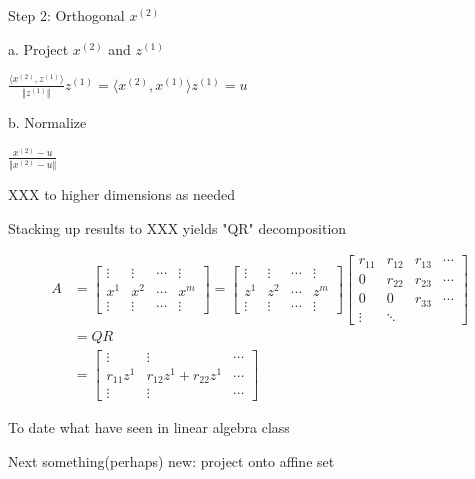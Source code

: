 Step 2: Orthogonal $x^{(2)}$

a.  Project $x^{(2)}$ and $z^{(1)}$

$\frac{\langle x^{(2)},z^{(1)}\rangle}{\Vert z^{(1)}\Vert} z^{(1)}=\langle x^{(2)},x^{(1)}\rangle z^{(1)}=u$


b. Normalize 

$\frac{x^{(2)}-u}{\Vert x^{(2)}-u\Vert}$

\begin{marginfigure}
	\centering
	\resizebox{7.5cm}{3cm}{}
	\caption{}
	\label{}
\end{marginfigure}

XXX to higher dimensions as needed


Stacking up results to XXX yields "QR" decomposition

\begin{align*}
	A&=\left[\begin{matrix}
	\vdots&\vdots&\cdots&\vdots\\
	x^{1}&x^{2}&\cdots&x^{m}\\
	\vdots&\vdots&\cdots&\vdots
	\end{matrix}\right]=\left[\begin{matrix}
	\vdots&\vdots&\cdots&\vdots\\
	z^{1}&z^{2}&\cdots&z^{m}\\
	\vdots&\vdots&\cdots&\vdots
	\end{matrix}\right]
	\left[\begin{matrix}
	r_{11}&r_{12}&r_{13}&\cdots\\
	0&r_{22}&r_{23}&\cdots\\
	0&0&r_{33}&\cdots\\
	\vdots&\ddots& & 
	\end{matrix}\right]\\
	&=QR\\
	&=\left[\begin{matrix}
	\vdots&\vdots&\cdots\\
	r_{11}z^{1}&r_{12}z^{1}+r_{22}z^{1}&\cdots \\
	\vdots&\vdots&\cdots 
	\end{matrix}\right]
\end{align*}

To date what have seen in linear algebra class

Next something(perhaps) new: project onto affine set

\begin{marginfigure}
	\centering
	\resizebox{7.5cm}{3cm}{}
	\caption{}
	\label{}
\end{marginfigure}

